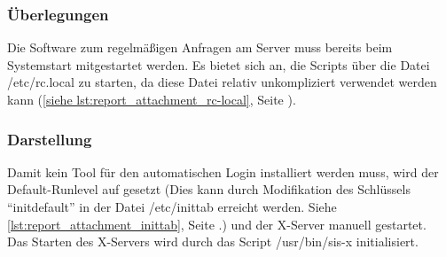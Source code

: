 \subsubsection{Überlegungen}

Die Software zum regelmäßigen Anfragen am Server muss bereits beim Systemstart mitgestartet werden. Es bietet sich an, die Scripts über die Datei /etc/rc.local zu starten, da diese Datei relativ unkompliziert verwendet werden kann (\autoref{siehe lst:report_attachment_rc-local}, Seite \pageref{lst:report_attachment_rc-local}).\\

\subsubsection{Darstellung}

Damit kein Tool für den automatischen Login installiert werden muss, wird der Default-Runlevel auf %
gesetzt (Dies kann durch Modifikation des Schlüssels \enquote{initdefault} in der Datei /etc/inittab erreicht werden. Siehe \autoref{lst:report_attachment_inittab}, Seite \pageref{lst:report_attachment_inittab}.) und der X-Server manuell gestartet.\\
Das Starten des X-Servers wird durch das Script /usr/bin/sis-x initialisiert.




